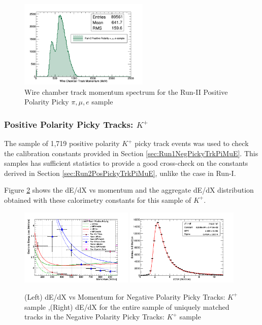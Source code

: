 \begin{figure}[htb]
\centering
\includegraphics[width=0.55\textwidth]{images/WCTrkMomentumRun2PosPiMuE.png}
\caption{Wire chamber track momentum spectrum for the Run-II Positive Polarity Picky $\pi, \mu, e$ sample  }
\label{fig:Run2PosPickyTrkPiMuEMomentumSpec}
\end{figure}

\subsubsection{Positive Polarity Picky Tracks: $K^{+}$}\label{sec:Run2PosPickyTrkKaons}
The sample of 1,719 positive polarity $K^{+}$ picky track events was used to check the calibration constants provided in Section \ref{sec:Run1NegPickyTrkPiMuE}. This samples has sufficient statistics to provide a good cross-check on the constants derived in Section \ref{sec:Run2PosPickyTrkPiMuE}, unlike the case in Run-I.

Figure \ref{fig:Run2PosPickyTrkKaonResults} shows the dE/dX vs momentum and the aggregate dE/dX distribution obtained with these calorimetry constants for this sample of $K^{+}$.

\begin{figure}[htb]
\centering
\includegraphics[width=0.48\textwidth]{images/dEdXvsMomentumPosPolRun2Kaon.png}
\includegraphics[width=0.48\textwidth]{images/dEdXKaonRunIIPosPol.png}
\caption{(Left) dE/dX vs Momentum for Negative Polarity Picky Tracks: $K^{+}$ sample ,(Right) dE/dX for the entire sample of uniquely matched tracks in the Negative Polarity Picky Tracks: $K^{+}$ sample }
\label{fig:Run2PosPickyTrkKaonResults}
\end{figure}


